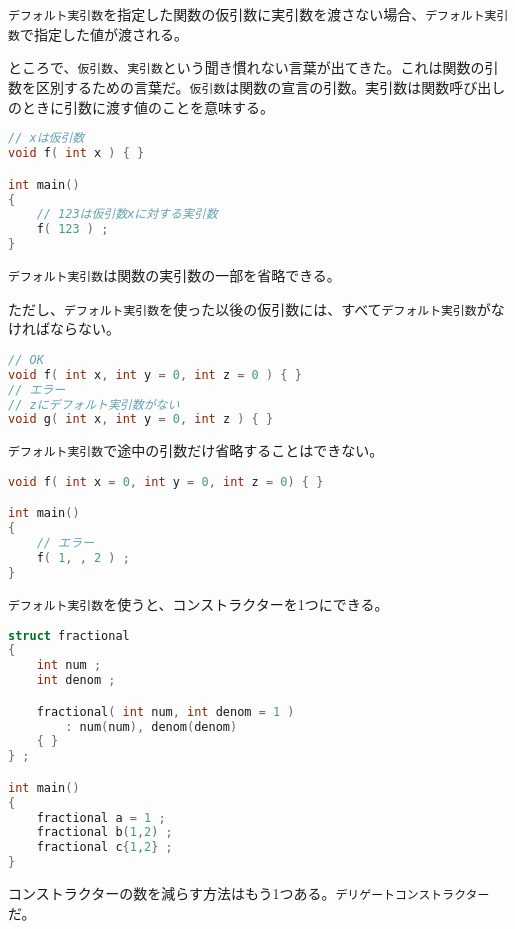 \texttt{デフォルト実引数}を指定した関数の仮引数に実引数を渡さない場合、\texttt{デフォルト実引数}で指定した値が渡される。

ところで、\texttt{仮引数}、\texttt{実引数}という聞き慣れない言葉が出てきた。これは関数の引数を区別するための言葉だ。\texttt{仮引数}は関数の宣言の引数。実引数は関数呼び出しのときに引数に渡す値のことを意味する。

\begin{lstlisting}[language={C++}]
// xは仮引数
void f( int x ) { }

int main()
{
    // 123は仮引数xに対する実引数
    f( 123 ) ;
}
\end{lstlisting}

\texttt{デフォルト実引数}は関数の実引数の一部を省略できる。

ただし、\texttt{デフォルト実引数}を使った以後の仮引数には、すべて\texttt{デフォルト実引数}がなければならない。

\begin{lstlisting}[language={C++}]
// OK
void f( int x, int y = 0, int z = 0 ) { }
// エラー
// zにデフォルト実引数がない
void g( int x, int y = 0, int z ) { }
\end{lstlisting}

\texttt{デフォルト実引数}で途中の引数だけ省略することはできない。

\begin{lstlisting}[language={C++}]
void f( int x = 0, int y = 0, int z = 0) { }

int main()
{
    // エラー
    f( 1, , 2 ) ;
}
\end{lstlisting}

\texttt{デフォルト実引数}を使うと、コンストラクターを1つにできる。

\begin{lstlisting}[language={C++}]
struct fractional
{
    int num ;
    int denom ;

    fractional( int num, int denom = 1 )
        : num(num), denom(denom)
    { }
} ;

int main()
{
    fractional a = 1 ;
    fractional b(1,2) ;
    fractional c{1,2} ;
}
\end{lstlisting}

コンストラクターの数を減らす方法はもう1つある。\texttt{デリゲートコンストラクター}だ。

